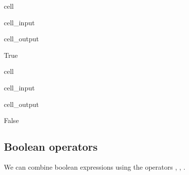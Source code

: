 \documentclass[letterpaper,10pt,english]{jupyterBook}
\begin{document}
\begin{sphinxuseclass}{cell}\begin{sphinxVerbatimInput}

\begin{sphinxuseclass}{cell_input}
\begin{sphinxVerbatim}[commandchars=\\\{\}]
\end{sphinxVerbatim}

\end{sphinxuseclass}\end{sphinxVerbatimInput}
\begin{sphinxVerbatimOutput}

\begin{sphinxuseclass}{cell_output}
\begin{sphinxVerbatim}[commandchars=\\\{\}]
True
\end{sphinxVerbatim}

\end{sphinxuseclass}\end{sphinxVerbatimOutput}

\end{sphinxuseclass}
\begin{sphinxuseclass}{cell}\begin{sphinxVerbatimInput}

\begin{sphinxuseclass}{cell_input}
\begin{sphinxVerbatim}[commandchars=\\\{\}]
\end{sphinxVerbatim}

\end{sphinxuseclass}\end{sphinxVerbatimInput}
\begin{sphinxVerbatimOutput}

\begin{sphinxuseclass}{cell_output}
\begin{sphinxVerbatim}[commandchars=\\\{\}]
False
\end{sphinxVerbatim}

\end{sphinxuseclass}\end{sphinxVerbatimOutput}

\end{sphinxuseclass}

\subsection{Boolean operators}
\label{\detokenize{datatypes:boolean-operators}}
\sphinxAtStartPar
We can combine boolean expressions using the operators , , .
\end{document}
